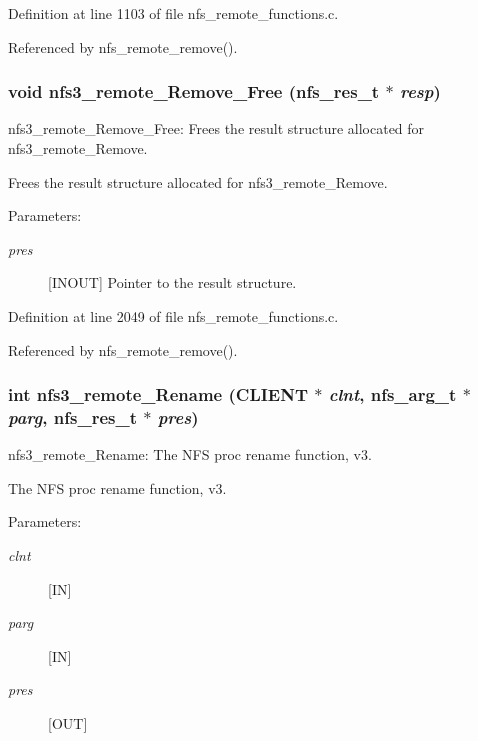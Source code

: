 Definition at line 1103 of file nfs\_\-remote\_\-functions.c.

Referenced by nfs\_\-remote\_\-remove().
\subsubsection{\setlength{\rightskip}{0pt plus 5cm}void nfs3\_\-remote\_\-Remove\_\-Free (nfs\_\-res\_\-t $\ast$ {\em resp})}\label{group__NFSprocs_ga83}


nfs3\_\-remote\_\-Remove\_\-Free: Frees the result structure allocated for nfs3\_\-remote\_\-Remove.

Frees the result structure allocated for nfs3\_\-remote\_\-Remove.

\begin{Desc}
\item[Parameters:]
\begin{description}
\item[{\em pres}][INOUT] Pointer to the result structure. \end{description}
\end{Desc}


Definition at line 2049 of file nfs\_\-remote\_\-functions.c.

Referenced by nfs\_\-remote\_\-remove().
\subsubsection{\setlength{\rightskip}{0pt plus 5cm}int nfs3\_\-remote\_\-Rename (CLIENT $\ast$ {\em clnt}, nfs\_\-arg\_\-t $\ast$ {\em parg}, nfs\_\-res\_\-t $\ast$ {\em pres})}\label{group__NFSprocs_ga27}


nfs3\_\-remote\_\-Rename: The NFS proc rename function, v3.

The NFS proc rename function, v3.

\begin{Desc}
\item[Parameters:]
\begin{description}
\item[{\em clnt}][IN] \item[{\em parg}][IN] \item[{\em pres}][OUT] \end{description}
\end{Desc}


